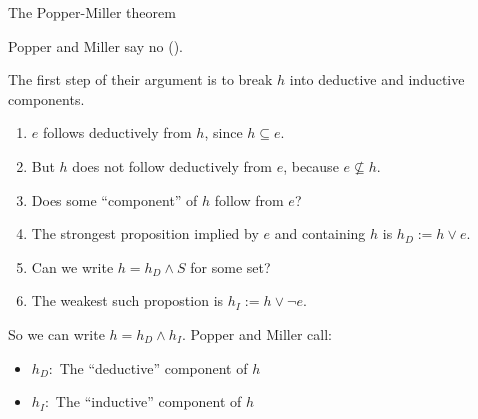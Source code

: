 \documentclass[8pt]{beamer}\usepackage[]{graphicx}\usepackage[]{color}
\begin{document}
\begin{frame}{The Popper-Miller theorem}

\setminipage{}


Popper and Miller say no (\cite{popper:1983:impossibilityinductiveprobability}).

The first step of their argument is to break $h$ into deductive and inductive
components.

\pause
%
\begin{enumerate}
%
\item $e$ follows deductively from $h$, since $h \subseteq e$.
\item But $h$ does not follow deductively from $e$, because $e \nsubseteq h$.
\item Does some ``component'' of $h$ follow from $e$?
\item The strongest proposition implied by $e$ and containing
   $h$ is $h_D := h \lor e$.
\item Can we write $h = h_D \land S$ for some set?
\item The weakest such propostion is $h_I := h \lor \lnot e$.
%
\end{enumerate}
%
So we can write $h = h_D \land h_I$.  Popper and Miller call:
%
\begin{itemize}
%
\item $h_D:$ The ``deductive'' component of $h$
\item $h_I:$ The ``inductive'' component of $h$
%
\end{itemize}
%
\end{frame}


\end{document}
